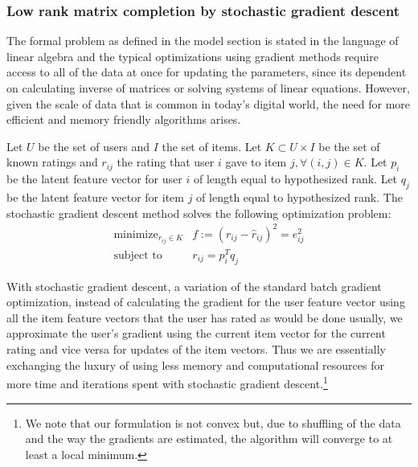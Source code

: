 \documentclass[12pt]{article}
\begin{document}
\subsubsection*{Low rank matrix completion by stochastic gradient descent}
The formal problem as defined in the model section is stated in the language of linear algebra and the typical optimizations using gradient methods require access to all of the data at once for updating the parameters, since its dependent on calculating inverse of matrices or solving systems of linear equations. However, given the scale of data that is common in today's digital world, the need for more efficient and memory friendly algorithms arises. 

Let $U$ be the set of users and $I$ the set of items. Let $K\subset U \times I$ be the set of known ratings and $r_{ij}$ the rating that user $i$ gave to item $j, \forall (i,j)\in K$. Let $p_i$  be the latent feature vector for user $i$ of length equal to hypothesized rank. Let $q_j$ be the latent feature vector for item $j$ of length equal to hypothesized rank. The stochastic gradient descent method solves the following optimization problem:
\begin{equation}
    \begin{array}{ll}
    \mbox{minimize}_{r_{ij}\in K}   & f:= (r_{ij} - \hat r_{ij})^2 = e_{ij}^2\\
    \mbox{subject to} & r_{ij} = p_i^T q_j
    \end{array}
    \label{eq:SGD}
\end{equation}

With stochastic gradient descent, a variation of the standard batch gradient optimization, instead of calculating the gradient for the user feature vector using all the item feature vectors that the user has rated as would be done  usually, we approximate the user's gradient using the current item vector for the current rating and vice versa for updates of the item vectors. Thus we are essentially exchanging the luxury of using less memory and computational resources for more time and iterations spent with stochastic gradient descent.\footnote{We note that our formulation is not convex but, due to shuffling of the data and the way the gradients are estimated, the algorithm will converge to at least a local minimum.}
\end{document}
